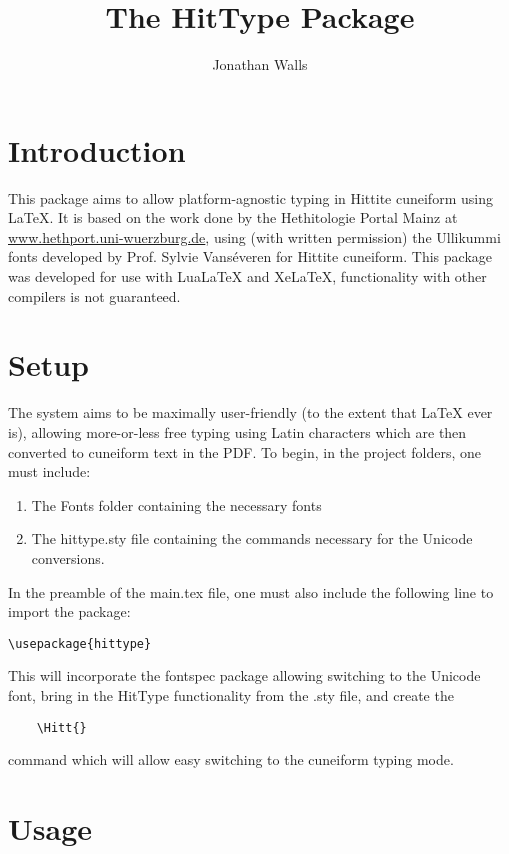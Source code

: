 \documentclass[12pt,A4]{article}
\title{The HitType Package}
\author{Jonathan Walls}
\begin{document}
\maketitle

\section{Introduction}
This package aims to allow platform-agnostic typing in Hittite cuneiform using LaTeX. It is based on the work done by the Hethitologie Portal Mainz at \href{https://www.hethport.uni-wuerzburg.de/cuneifont/}{www.hethport.uni-wuerzburg.de}, using (with written permission) the Ullikummi fonts developed by Prof. Sylvie Vanséveren for Hittite cuneiform. This package was developed for use with LuaLaTeX and XeLaTeX, functionality with other compilers is not guaranteed.

\section{Setup}
The system aims to be maximally user-friendly (to the extent that LaTeX ever is), allowing more-or-less free typing using Latin characters which are then converted to cuneiform text in the PDF. To begin, in the project folders, one must include:
\begin{enumerate}
    \item The Fonts folder containing the necessary fonts
    \item The hittype.sty file containing the commands necessary for the Unicode conversions.
\end{enumerate}

In the preamble of the main.tex file, one must also include the following line to import the package:\small
\begin{verbatim}
\usepackage{hittype}
\end{verbatim}
\normalsize
This will incorporate the fontspec package allowing switching to the Unicode font, bring in the HitType functionality from the .sty file, and create the 
\begin{verbatim}
    \Hitt{}
\end{verbatim} 
command which will allow easy switching to the cuneiform typing mode.

\section{Usage}
\end{document}
